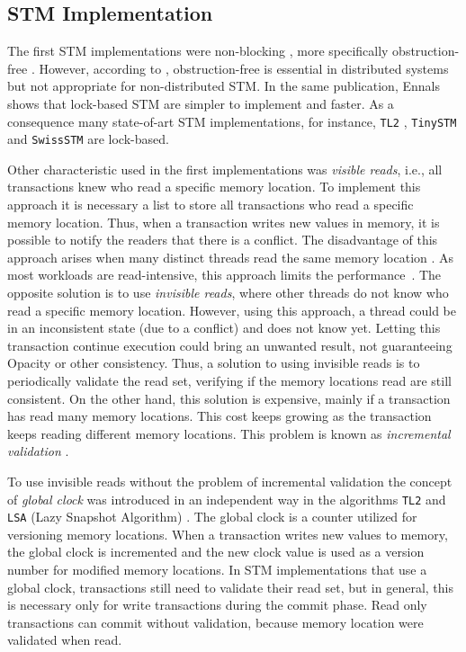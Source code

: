 \subsection{STM Implementation}\label{sec:implementationTM}

The first STM implementations were non-blocking \cite{Shavit:1997}, more specifically obstruction-free \cite{Herlihy:2003_2}. However, according to , obstruction-free is essential in distributed systems but not appropriate for non-distributed STM. In the same publication, Ennals shows that lock-based STM are simpler to implement and faster. As a consequence many state-of-art STM implementations, for instance, \texttt{TL2} \cite{TL2}, \texttt{TinySTM} \cite{TinySTM2} and \texttt{SwissSTM} \cite{SwissTM} are lock-based.

Other characteristic used in the first implementations was \emph{visible reads}, i.e., all transactions knew who read a specific memory location. To implement this approach it is necessary a list to store all transactions who read a specific memory location. Thus, when a transaction writes new values in memory, it is possible to notify the readers that there is a conflict. The disadvantage of this approach arises when many distinct threads read the same memory location \cite{TinySTM2}. As most workloads are read-intensive, this approach limits the performance~\cite{Sutra:2018}. The opposite solution is to use \emph{invisible reads}, where other threads do not know who read a specific memory location. However, using this approach, a thread could be in an inconsistent state (due to a conflict) and does not know yet. Letting this transaction continue  execution could bring an unwanted result, not guaranteeing Opacity or other consistency. Thus, a solution to using invisible reads is to periodically validate the read set, verifying if the memory locations read are still consistent. On the other hand, this solution is expensive, mainly if a transaction has read many memory locations. This cost keeps growing as the transaction keeps reading different memory locations. This problem is known as \emph{incremental validation} \cite{Harris:2010}.

To use invisible reads without the problem of incremental validation the concept of \emph{global clock} was introduced in an independent way in the algorithms \texttt{TL2} \cite{TL2} and \texttt{LSA} (Lazy Snapshot Algorithm) \cite{Riegel:2006}. The global clock is a counter utilized for versioning memory locations. When a transaction writes new values to  memory, the global clock is incremented and the new clock value is used as a version number for modified memory locations. In STM implementations that use a global clock, transactions still need to validate their read set, but in general, this is necessary only for write transactions during the commit phase. Read only transactions can commit without validation, because  memory location were validated when read. 

